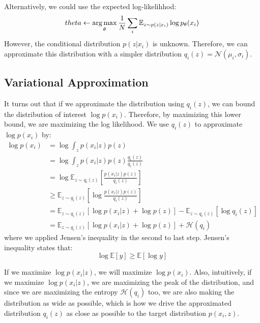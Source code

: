 Alternatively, we could use the expected log-likelihhod:
\[
theta\leftarrow \operatorname*{arg\,max}_\theta\frac{1}{N}\sum_i\mathbb{E}_{z\sim p(z|x_i)}\log p_\theta(x_i)
\]
However, the conditional distribution $p(z|x_i)$ is unknown. Therefore, we can approximate this distribution with a simpler distribution $q_i(z) =\mathcal{N}(\mu_i,\sigma_i)$.

\subsection{Variational Approximation}
It turns out that if we approximate the distribution using $q_i(z)$, we can bound the distribution of interest $\log p(x_i)$. Therefore, by maximizing this lower bound, we are maximizing the log likelihood. We use $q_i(z)$ to approximate $\log p(x_i)$ by:
\begin{align*}
    \log p(x_i) &= \log \int_z p(x_i|z)p(z)\\
    &= \log \int_z p(x_i|z)p(z)\frac{q_i(z)}{q_i(z)}\\
    &= \log\mathbb{E}_{z\sim q_i(z)}\left[\frac{p(x_i|z)p(z)}{q_i(z)}\right]\\
    &\geq \mathbb{E}_{z\sim q_i(z)}\left[\log \frac{p(x_i|z)p(z)}{q_i(z)}\right]\\
    &=\mathbb{E}_{z\sim q_i(z)}\left[\log p(x_i|z)+\log p(z)\right]-\mathbb{E}_{z\sim q_i(z)}\left[\log q_i(z)\right]\\
    &= \mathbb{E}_{z\sim q_i(z)}\left[\log p(x_i|z)+\log p(z)\right] + \mathcal{H}(q_i)
\end{align*}
where we applied Jensen's inequality in the second to last step. Jensen's inequality states that:
\[
\log \mathbb{E}[y] \geq \mathbb{E}[\log y]
\]

If we maximize $\log p(x_i|z)$, we will maximize $\log p(x_i)$. Also, intuitively, if we maximize $\log p(x_i|z)$, we are maximizing the peak of the distribution, and since we are maximizing the entropy $\mathcal{H}(q_i)$ too, we are also making the distribution as wide as possible, which is how we drive the approximated distribution $q_i(z)$ as close as possible to the target distribution $p(x_i,z)$.

